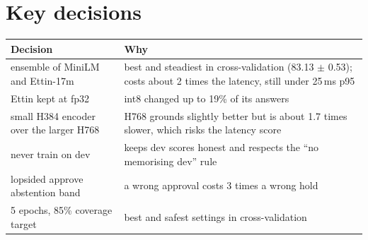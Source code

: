 \documentclass[11pt,a4paper]{article}
\begin{document}
\section{Key decisions}
\noindent\begin{tabularx}{\linewidth}{@{}lL@{}}
\toprule
Decision & Why \\
\midrule
ensemble of MiniLM and Ettin-17m & best and steadiest in cross-validation (83.13 $\pm$ 0.53); costs about 2 times the latency, still under 25\,ms p95 \\
Ettin kept at fp32 & int8 changed up to 19\% of its answers \\
small H384 encoder over the larger H768 & H768 grounds slightly better but is about 1.7 times slower, which risks the latency score \\
never train on dev & keeps dev scores honest and respects the ``no memorising dev'' rule \\
lopsided approve abstention band & a wrong approval costs 3 times a wrong hold \\
5 epochs, 85\% coverage target & best and safest settings in cross-validation \\
\bottomrule
\end{tabularx}
\end{document}
